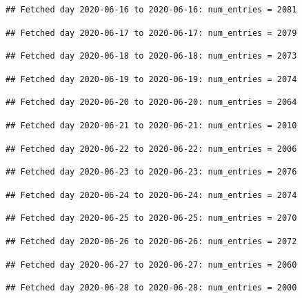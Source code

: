 \documentclass[]{article}
\begin{document}
\begin{verbatim}
## Fetched day 2020-06-16 to 2020-06-16: num_entries = 2081
\end{verbatim}

\begin{verbatim}
## Fetched day 2020-06-17 to 2020-06-17: num_entries = 2079
\end{verbatim}

\begin{verbatim}
## Fetched day 2020-06-18 to 2020-06-18: num_entries = 2073
\end{verbatim}

\begin{verbatim}
## Fetched day 2020-06-19 to 2020-06-19: num_entries = 2074
\end{verbatim}

\begin{verbatim}
## Fetched day 2020-06-20 to 2020-06-20: num_entries = 2064
\end{verbatim}

\begin{verbatim}
## Fetched day 2020-06-21 to 2020-06-21: num_entries = 2010
\end{verbatim}

\begin{verbatim}
## Fetched day 2020-06-22 to 2020-06-22: num_entries = 2006
\end{verbatim}

\begin{verbatim}
## Fetched day 2020-06-23 to 2020-06-23: num_entries = 2076
\end{verbatim}

\begin{verbatim}
## Fetched day 2020-06-24 to 2020-06-24: num_entries = 2074
\end{verbatim}

\begin{verbatim}
## Fetched day 2020-06-25 to 2020-06-25: num_entries = 2070
\end{verbatim}

\begin{verbatim}
## Fetched day 2020-06-26 to 2020-06-26: num_entries = 2072
\end{verbatim}

\begin{verbatim}
## Fetched day 2020-06-27 to 2020-06-27: num_entries = 2060
\end{verbatim}

\begin{verbatim}
## Fetched day 2020-06-28 to 2020-06-28: num_entries = 2000
\end{verbatim}
\end{document}
